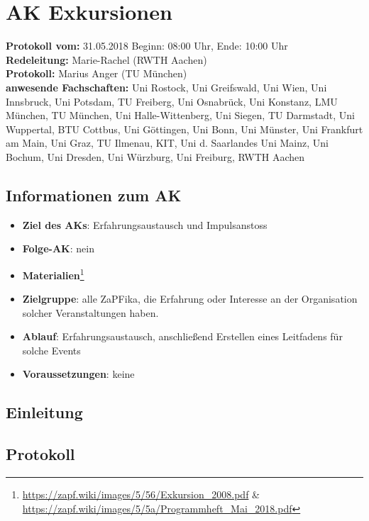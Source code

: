 
\section{AK Exkursionen}

  \textbf{Protokoll vom:} 31.05.2018
  Beginn: 08:00 Uhr,
  Ende: 10:00 Uhr \\
  \textbf{Redeleitung:} Marie-Rachel (RWTH Aachen) \\
  \textbf{Protokoll:} Marius Anger (TU München) \\
  \textbf{anwesende Fachschaften:} Uni Rostock, Uni Greifswald, Uni Wien, Uni Innsbruck, Uni Potsdam, TU Freiberg, Uni Osnabrück, Uni Konstanz, LMU München, TU München, Uni Halle-Wittenberg, Uni Siegen, TU Darmstadt, Uni Wuppertal, BTU Cottbus, Uni Göttingen, Uni Bonn, Uni Münster, Uni Frankfurt am Main, Uni Graz, TU Ilmenau, KIT, Uni d. Saarlandes Uni Mainz, Uni Bochum, Uni Dresden, Uni Würzburg, Uni Freiburg, RWTH Aachen

  \subsection*{Informationen zum AK}
    \begin{itemize}
    	\item \textbf{Ziel des AKs}: Erfahrungsaustausch und Impulsanstoss
    	\item \textbf{Folge-AK}: nein
      \item \textbf{Materialien}\footnote{\url{https://zapf.wiki/images/5/56/Exkursion_2008.pdf} \& \url{https://zapf.wiki/images/5/5a/Programmheft_Mai_2018.pdf}}
    	\item \textbf{Zielgruppe}: alle ZaPFika, die Erfahrung oder Interesse an der Organisation solcher Veranstaltungen haben.
    	\item \textbf{Ablauf}: Erfahrungsaustausch, anschließend Erstellen eines Leitfadens für solche Events
    	\item \textbf{Voraussetzungen}: keine
    \end{itemize}

  \subsection*{Einleitung}

  \subsection*{Protokoll}
